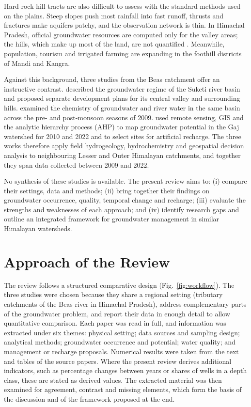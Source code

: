 \documentclass[10pt,a4paper,twocolumn]{article}
\begin{document}
Hard-rock hill tracts are also difficult to assess with the standard methods used on the
plains. Steep slopes push most rainfall into fast runoff, thrusts and fractures make
aquifers patchy, and the observation network is thin. In Himachal Pradesh, official
groundwater resources are computed only for the valley areas; the hills, which make up most
of the land, are not quantified \citep{cgwb2006,pophare2015}. Meanwhile, population, tourism
and irrigated farming are expanding in the foothill districts of Mandi and Kangra.

Against this background, three studies from the Beas catchment offer an instructive
contrast. \citet{pophare2015} described the groundwater regime of the Suketi river basin and
proposed separate development plans for its central valley and surrounding hills.
\citet{pophare2018} examined the chemistry of groundwater and river water in the same basin
across the pre- and post-monsoon seasons of 2009. \citet{sharma2025} used remote sensing, GIS
and the analytic hierarchy process (AHP) to map groundwater potential in the Gaj watershed
for 2010 and 2022 and to select sites for artificial recharge. The three works therefore
apply field hydrogeology, hydrochemistry and geospatial decision analysis to neighbouring
Lesser and Outer Himalayan catchments, and together they span data collected between 2009
and 2022.

No synthesis of these studies is available. The present review aims to: (i) compare their
settings, data and methods; (ii) bring together their findings on groundwater occurrence,
quality, temporal change and recharge; (iii) evaluate the strengths and weaknesses of each
approach; and (iv) identify research gaps and outline an integrated framework for
groundwater management in similar Himalayan watersheds.

\section{Approach of the Review}

The review follows a structured comparative design (Fig.~\ref{fig:workflow}). The three
studies were chosen because they share a regional setting (tributary catchments of the Beas
river in Himachal Pradesh), address complementary parts of the groundwater problem, and
report their data in enough detail to allow quantitative comparison. Each paper was read in
full, and information was extracted under six themes: physical setting; data sources and
sampling design; analytical methods; groundwater occurrence and potential; water quality;
and management or recharge proposals. Numerical results were taken from the text and tables
of the source papers. Where the present review derives additional indicators, such as
percentage changes between years or shares of wells in a depth class, these are stated as
derived values. The extracted material was then examined for agreement, contrast and
missing elements, which form the basis of the discussion and of the framework proposed
at the end.
\end{document}
